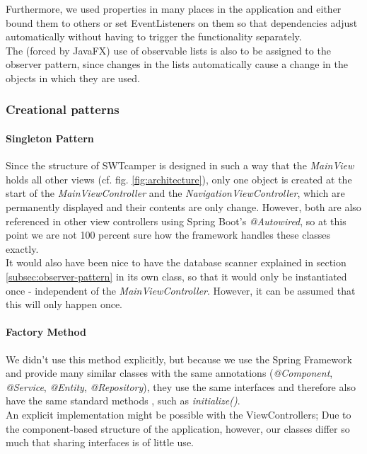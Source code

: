 Furthermore, we used properties in many places in the application and either bound them to others or set EventListeners on them so that dependencies adjust automatically without having to trigger the functionality separately. \\
The (forced by JavaFX) use of observable lists is also to be assigned to the observer pattern, since changes in the lists automatically cause a change in the objects in which they are used.

\subsubsection{Creational patterns}

\paragraph{Singleton Pattern}
Since the structure of SWTcamper is designed in such a way that the \textit{MainView} holds all other views (cf. fig. \ref{fig:architecture}), only one object is created at the start of the \textit{MainViewController} and the \textit{NavigationViewController}, which are permanently displayed and their contents are only change. However, both are also referenced in other view controllers using Spring Boot's \textit{@Autowired}, so at this point we are not 100 percent sure how the framework handles these classes exactly. \\
It would also have been nice to have the database scanner explained in section \ref{subsec:observer-pattern} in its own class, so that it would only be instantiated once - independent of the \textit{MainViewController}. However, it can be assumed that this will only happen once.

\paragraph{Factory Method}
We didn't use this method explicitly, but because we use the Spring Framework and provide many similar classes with the same annotations (\textit{@Component}, \textit{@Service}, \textit{@Entity}, \textit{@Repository}), they use the same interfaces and therefore also have the same standard methods , such as \textit{initialize()}. \\
An explicit implementation might be possible with the ViewControllers; Due to the component-based structure of the application, however, our classes differ so much that sharing interfaces is of little use.


